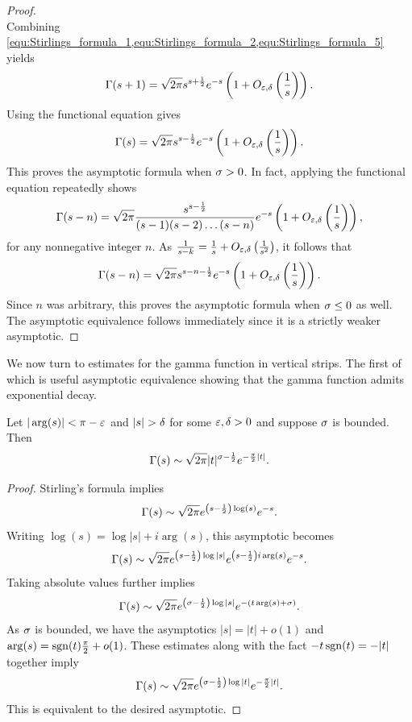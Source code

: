 \begin{proof}
\begin{equation}
      \end{equation}
      Combining \cref{equ:Stirlings_formula_1,equ:Stirlings_formula_2,equ:Stirlings_formula_5} yields
      \[
        \Gamma(s+1) = \sqrt{2\pi}s^{s+\frac{1}{2}}e^{-s}\left(1+O_{\varepsilon,\delta}\left(\frac{1}{s}\right)\right).
      \]
      Using the functional equation gives
      \[
        \Gamma(s) = \sqrt{2\pi}s^{s-\frac{1}{2}}e^{-s}\left(1+O_{\varepsilon,\delta}\left(\frac{1}{s}\right)\right).
      \]
      This proves the asymptotic formula when \(\sigma > 0\). In fact, applying the functional equation repeatedly shows
      \[
        \Gamma(s-n) = \sqrt{2\pi}\frac{s^{s-\frac{1}{2}}}{(s-1)(s-2) \ldots (s-n)}e^{-s}\left(1+O_{\varepsilon,\delta}\left(\frac{1}{s}\right)\right),
      \]
      for any nonnegative integer \(n\). As \(\frac{1}{s-k} = \frac{1}{s}+O_{\varepsilon,\delta}\left(\frac{1}{s^{2}}\right)\), it follows that
      \[
        \Gamma(s-n) = \sqrt{2\pi}s^{s-n-\frac{1}{2}}e^{-s}\left(1+O_{\varepsilon,\delta}\left(\frac{1}{s}\right)\right).
      \]
      Since \(n\) was arbitrary, this proves the asymptotic formula when \(\sigma \le 0\) as well. The asymptotic equivalence follows immediately since it is a strictly weaker asymptotic.
    \end{proof}

    We now turn to estimates for the gamma function in vertical strips. The first of which is useful asymptotic equivalence showing that the gamma function admits exponential decay.

    \begin{corollary}\label{equ:weaker_Stirling_formula_1}
      Let \(|\arg(s)| < \pi-\varepsilon\) and \(|s| > \delta\) for some \(\varepsilon,\delta > 0\) and suppose \(\sigma\) is bounded. Then
      \[
        \Gamma(s) \sim \sqrt{2\pi}|t|^{\sigma-\frac{1}{2}}e^{-\frac{\pi}{2}|t|}.
      \]
    \end{corollary}
    \begin{proof}
      Stirling's formula implies
      \[
        \Gamma(s) \sim \sqrt{2\pi}e^{\left(s-\frac{1}{2}\right)\log(s)}e^{-s}.
      \]
      Writing \(\log(s) = \log|s|+i\arg(s)\), this asymptotic becomes
      \[
        \Gamma(s) \sim \sqrt{2\pi}e^{\left(s-\frac{1}{2}\right)\log|s|}e^{\left(s-\frac{1}{2}\right)i\arg(s)}e^{-s}.
      \]
      Taking absolute values further implies
      \[
        \Gamma(s) \sim \sqrt{2\pi}e^{\left(\sigma-\frac{1}{2}\right)\log|s|}e^{-(t\arg(s)+\sigma)}.
      \]
      As \(\sigma\) is bounded, we have the asymptotics \(|s| = |t|+o(1)\) and \(\arg(s) = \operatorname{\mathrm{sgn}}(t)\frac{\pi}{2}+o(1)\). These estimates along with the fact \(-t\operatorname{\mathrm{sgn}}(t) = -|t|\) together imply
      \[
        \Gamma(s) \sim \sqrt{2\pi}e^{\left(\sigma-\frac{1}{2}\right)\log|t|}e^{-\frac{\pi}{2}|t|}.
      \]
      This is equivalent to the desired asymptotic.
    \end{proof}

